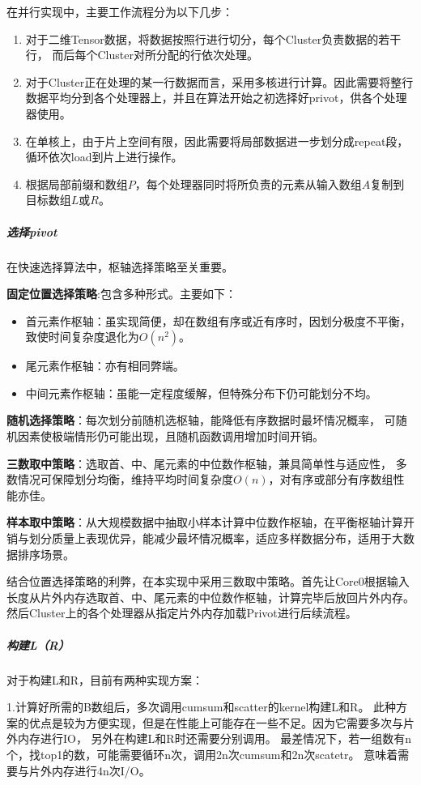 在并行实现中，主要工作流程分为以下几步：
\begin{enumerate}
    \item 对于二维Tensor数据，将数据按照行进行切分，每个Cluster负责数据的若干行，
    而后每个Cluster对所分配的行依次处理。
    \item 对于Cluster正在处理的某一行数据而言，采用多核进行计算。因此需要将整行数据平均分到各个处理器上，并且在算法开始之初选择好privot，供各个处理器使用。
    \item 在单核上，由于片上空间有限，因此需要将局部数据进一步划分成repeat段，循环依次load到片上进行操作。
    \item 根据局部前缀和数组\(P\)，每个处理器同时将所负责的元素从输入数组\(A\)复制到目标数组\(L\)或\(R\)。
\end{enumerate}
\subparagraph{选择pivot}
在快速选择算法中，枢轴选择策略至关重要。

\textbf{固定位置选择策略}:包含多种形式。主要如下：

\begin{itemize}
    \item 首元素作枢轴：虽实现简便，却在数组有序或近有序时，因划分极度不平衡，致使时间复杂度退化为\(O(n^{2})\)。
    \item 尾元素作枢轴：亦有相同弊端。
    \item 中间元素作枢轴：虽能一定程度缓解，但特殊分布下仍可能划分不均。
\end{itemize}

\textbf{随机选择策略}：每次划分前随机选枢轴，能降低有序数据时最坏情况概率，
可随机因素使极端情形仍可能出现，且随机函数调用增加时间开销。

\textbf{三数取中策略}：选取首、中、尾元素的中位数作枢轴，兼具简单性与适应性，
多数情况可保障划分均衡，维持平均时间复杂度\(O(n)\)，对有序或部分有序数组性能亦佳。

\textbf{样本取中策略}：从大规模数据中抽取小样本计算中位数作枢轴，在平衡枢轴计算开销与划分质量上表现优异，能减少最坏情况概率，适应多样数据分布，适用于大数据排序场景。

结合位置选择策略的利弊，在本实现中采用三数取中策略。首先让Core0根据输入长度从片外内存选取首、中、尾元素的中位数作枢轴，计算完毕后放回片外内存。
然后Cluster上的各个处理器从指定片外内存加载Privot进行后续流程。
\subparagraph{构建L（R）}


对于构建L和R，目前有两种实现方案：

1.计算好所需的B数组后，多次调用cumsum和scatter的kernel构建L和R。
此种方案的优点是较为方便实现，但是在性能上可能存在一些不足。因为它需要多次与片外内存进行IO，
另外在构建L和R时还需要分别调用。
最差情况下，若一组数有n个，找top1的数，可能需要循环n次，调用2n次cumsum和2n次scatetr。
意味着需要与片外内存进行4n次I/O。

